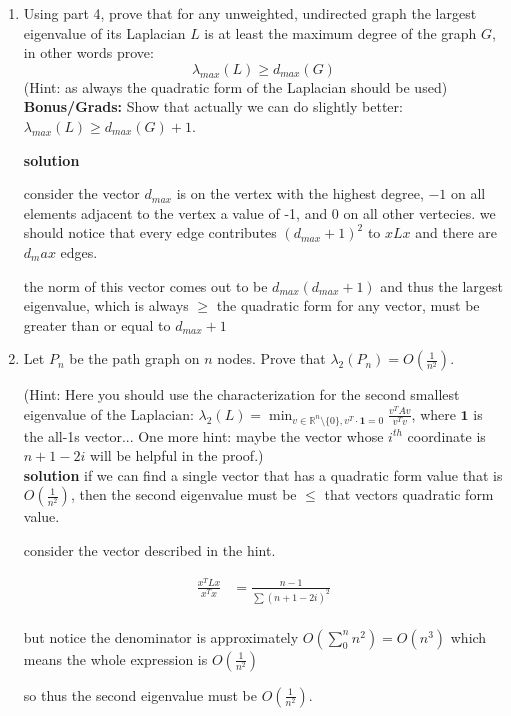 \documentclass{article}
\newcommand{\sol}{\textbf{solution}}
\begin{document}
\begin{enumerate}
    where \(\delta_{ij}\) is the kronecker delta,

    note that since the vectors are normalized, the squared sum of \(c_i\) is also normalized. the way to get the largest value is therefore for \(c_L=1\) for \(L\) corresponding to the index of the largest eigenvector 



    \item Using part 4, prove that for any unweighted, undirected graph the largest eigenvalue of its Laplacian $L$ is at least the maximum degree of the graph $G$, in other words prove:
    \[
    \lambda_{max}(L)\ge d_{max}(G)
    \]
    (Hint: as always the quadratic form of the Laplacian should be used)
    \textbf{Bonus/Grads:} Show that actually we can do slightly better: $\lambda_{max}(L)\ge d_{max}(G)+1$. 


    \sol 

    consider the vector \(d_{max}\) is on the vertex with the highest degree, \(-1\) on all elements adjacent to the vertex a value of -1, and 0 on all other vertecies. we should notice that every edge contributes \((d_{max}+1)^2\) to \(xLx\) and there are \(d_max\) edges. 

    the norm of this vector comes out to be \(d_{max}(d_{max}+1)\) and thus the largest eigenvalue, which is always \(\geq\) the quadratic form for any vector, must be greater than or equal to \(d_{max}+1\)
    


    \item Let $P_n$ be the path graph on $n$ nodes. Prove that $\lambda_2(P_n) = O(\frac{1}{n^2})$.
    
    (Hint: Here you should use the characterization for the second smallest eigenvalue of the Laplacian: $\lambda_2(L)=\min_{v\in \mathbb{R}^n\setminus\{0\},v^T\cdot \textbf{1}=0} \frac{v^TAv}{v^Tv}$, where $\textbf{1}$ is the all-1s vector... One more hint: maybe the vector whose $i^{th}$ coordinate is $n+1-2i$ will be helpful in the proof.)\\

    \sol
    if we can find a single vector that has a quadratic form value that is \(O(\frac{1}{n^2})\), then the second eigenvalue must be \(\leq\) that vectors quadratic form value. 

    consider the vector described in the hint. 

    \begin{equation}\begin{split}
            \frac{x^TLx}{x^Tx} &= \frac{n-1}{\sum (n+1-2i)^2}\\
    \end{split}
    \end{equation}

    but notice the denominator is approximately \(O(\sum_0^n n^2) = O(n^3)\)
    which means the whole expression is \(O(\frac{1}{n^2})\)

    so thus the second eigenvalue must be \(O(\frac{1}{n^2})\).


\end{enumerate}
\end{document}
